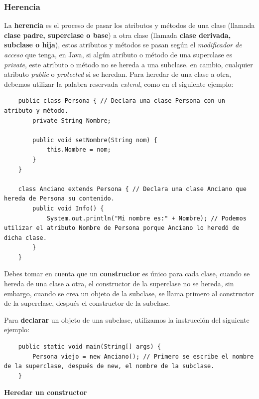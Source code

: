 \subsubsection{Herencia}
\hspace{0.55cm}La \textbf{herencia} es el proceso de pasar los atributos y métodos de una clase (llamada \textbf{clase padre, superclase o base}) a otra clase (llamada \textbf{clase derivada, subclase o hija}), estos atributos y métodos se pasan según el \textit{modificador de acceso} que tenga, en Java, si algún atributo o método de una superclase es \textit{private}, este atributo o método no se hereda a una subclase. en cambio, cualquier atributo \textit{public} o \textit{protected} si se heredan. Para heredar de una clase a otra, debemos utilizar la palabra reservada \textit{extend}, como en el siguiente ejemplo:
\begin{lstlisting}
    public class Persona { // Declara una clase Persona con un atributo y método.
        private String Nombre;
        
        public void setNombre(String nom) {
            this.Nombre = nom;
        }
    }
    
    class Anciano extends Persona { // Declara una clase Anciano que hereda de Persona su contenido.
        public void Info() {
            System.out.println("Mi nombre es:" + Nombre); // Podemos utilizar el atributo Nombre de Persona porque Anciano lo heredó de dicha clase.
        }
    }
\end{lstlisting}

Debes tomar en cuenta que un \textbf{constructor} es único para cada clase, cuando se hereda de una clase a otra, el constructor de la superclase no se hereda, sin embargo, cuando se crea un objeto de la subclase, se llama primero al constructor de la superclase, después el constructor de la subclase.

Para \textbf{declarar} un objeto de una subclase, utilizamos la instrucción del siguiente ejemplo:
\begin{lstlisting}
    public static void main(String[] args) {
        Persona viejo = new Anciano(); // Primero se escribe el nombre de la superclase, después de new, el nombre de la subclase.
    }
\end{lstlisting}

\textbf{Heredar un constructor}

